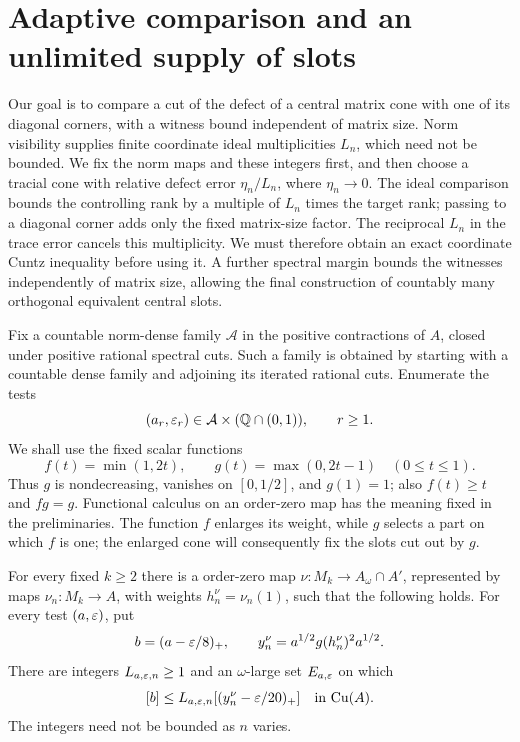\section{Adaptive comparison and an unlimited supply of slots}
\label{sec:comparison}

Our goal is to compare a cut of the defect of a central matrix cone
with one of its diagonal corners, with a witness bound independent of
matrix size.  Norm visibility supplies finite coordinate ideal
multiplicities $L_n$, which need not be bounded.  We fix the norm
maps and these integers first, and then choose a tracial cone with
relative defect error $\eta_n/L_n$, where $\eta_n\to0$.
The ideal comparison bounds the controlling rank by a multiple of
$L_n$ times the target rank; passing to a diagonal corner adds only
the fixed matrix-size factor.  The reciprocal $L_n$ in the trace
error cancels this multiplicity.  We must therefore obtain an exact
coordinate Cuntz inequality before using it.  A further spectral
margin bounds the witnesses independently of matrix size, allowing
the final construction of countably many orthogonal equivalent
central slots.

Fix a countable norm-dense family $\mathcal A$ in the positive
contractions of $A$, closed under positive rational spectral cuts.
Such a family is obtained by starting with a countable dense family
and adjoining its iterated rational cuts.  Enumerate the tests
\[
 (a_r,\varepsilon_r)\in\mathcal A\times(\mathbb Q\cap(0,1)),
 \qquad r\ge1.
\]
We shall use the fixed scalar functions
\begin{equation}\label{cmp:cutoff-functions}
 f(t)=\min(1,2t),\qquad g(t)=\max(0,2t-1)
       \quad(0\le t\le1).
\end{equation}
Thus $g$ is nondecreasing, vanishes on $[0,1/2]$, and $g(1)=1$;
also $f(t)\ge t$ and $fg=g$.  Functional calculus on an order-zero
map has the meaning fixed in the preliminaries.  The function $f$
enlarges its weight, while $g$ selects a part on which $f$ is one;
the enlarged cone will consequently fix the slots cut out by $g$.

\begin{proposition}\label{prop:idealvisibility}
For every fixed $k\ge2$ there is a \cpc order-zero map
$\nu:M_k\to A_\omega\cap A'$, represented by \cpc maps
$\nu_n:M_k\to A$, with weights $h_n^\nu=\nu_n(1)$, such that the
following holds.  For every test $(a,\varepsilon)$, put
\[
 b=(a-\varepsilon/8)_+,\qquad
 y_n^\nu=a^{1/2}g(h_n^\nu)^2a^{1/2}.
\]
There are integers $L_{a,\varepsilon,n}\ge1$ and an $\omega$-large set
$E_{a,\varepsilon}$ on which
\begin{equation}\label{cmp:I}
 [b]\le L_{a,\varepsilon,n}[(y_n^\nu-\varepsilon/20)_+]
          \quad\text{in }\mathrm{Cu}(A).
\end{equation}
The integers need not be bounded as $n$ varies.
\end{proposition}

